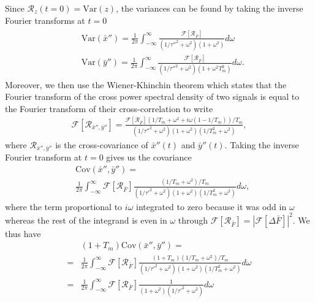 \documentclass[%
 reprint,prx,
superscriptaddress,
%
%
%
%
%
%
%
%
%
 amsmath,amssymb,
 aps,
%
%
%
%
%
%
]{revtex4-2}
\begin{document}
{Since $\mathcal{R}_{z}(t = 0) = \text{Var}(z)$, the variances can be found by taking the inverse Fourier transforms at $t = 0$
\begin{align}
\begin{split}
 &\text{Var}(\bar{x}'') = \frac{1}{2\pi}\int_{-\infty}^{\infty}\frac{\mathcal{F}[\mathcal{R}_{\bar{F}}]}{(1/\tau''^{2} + \omega^{2})(1 + \omega^{2})}d\omega \\
 &\text{Var}(\bar{y}'') = \frac{1}{2\pi}\int_{-\infty}^{\infty}\frac{\mathcal{F}[\mathcal{R}_{\bar{F}}]}{(1/\tau''^{2} + \omega^{2})(1 + \omega^{2}T_{m}^{2})}d\omega.
\end{split}
\label{EQ: no-feedback 3-step single bar variances from Fourier}
\end{align}
Moreover, we then use the Wiener-Khinchin theorem \cite{davenport1958introduction} which states that the Fourier transform of the cross power spectral density of two signals is equal to the Fourier transform of their cross-correlation to write 
\begin{align*}
 \mathcal{F}[\mathcal{R}_{\bar{x}'',\bar{y}''}] = \frac{\mathcal{F}[\mathcal{R}_{\bar{F}}](1/T_{m} +\omega^{2} +i\omega(1 - 1/T_{m}))/T_{m}}{(1/\tau''^{2} + \omega^{2})(1 + \omega^{2})(1/T_{m}^{2} + \omega^{2})},
 \end{align*}
where $\mathcal{R}_{\bar{x}'',\bar{y}''}$ is the cross-covariance of $\bar{x}''(t)$ and $\bar{y}''(t)$. Taking the inverse Fourier transform at $t=0$ gives us the covariance
\begin{align*}
 &\text{Cov}(\bar{x}'', \bar{y}'') =  \\ &\frac{1}{2\pi}\int_{-\infty}^{\infty}\mathcal{F}[\mathcal{R}_{\bar{F}}]\frac{(1/T_{m} + \omega^{2})/T_{m}}{(1/\tau'^{2} + \omega^{2})(1+\omega^{2})(1/T_{m}^{2} + \omega^{2})}d\omega,
\end{align*}
where the term proportional to $i\omega$ integrated to zero because it was odd in $\omega$ whereas the rest of the integrand is even in $\omega$ through $\mathcal{F}[\mathcal{R}_{\bar{F}}] = |\mathcal{F}[\Delta \bar{F}]|^{2}$.
We thus have
\begin{align*}
    &(1+T_{m})\text{Cov}(\bar{x}'', \bar{y}'') = 
    \\
    =& \frac{1}{2\pi}\int_{-\infty}^{\infty}\mathcal{F}[\mathcal{R}_{\bar{F}}]\frac{(1+T_{m})(1/T_{m} + \omega^{2})/T_{m}}{(1/\tau'^{2} + \omega^{2})(1+\omega^{2})(1/T_{m}^{2} + \omega^{2})}d\omega\\
    =& \frac{1}{2\pi}\int_{-\infty}^{\infty}\mathcal{F}[\mathcal{R}_{\bar{F}}]\frac{1}{(1+\omega^{2})(1/\tau'^{2} + \omega^{2})}d\omega \\

\end{align*}}
\end{document}
